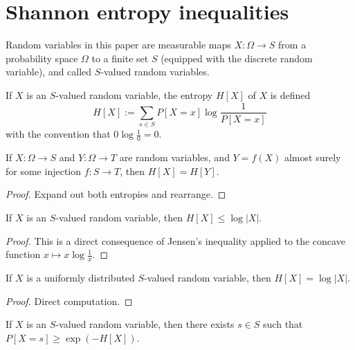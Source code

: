 \chapter{Shannon entropy inequalities}

Random variables in this paper are measurable maps $X : \Omega \to S$ from a probability space $\Omega$ to a finite set $S$ (equipped with the discrete random variable), and called $S$-valued random variables.

\begin{definition}[Entropy]
  \label{entropy-def}
  \leanok
  If $X$ is an $S$-valued random variable, the entropy $H[X]$ of $X$ is defined
  $$ H[X] := \sum_{s \in S} P[X=x] \log \frac{1}{P[X=x]}$$
  with the convention that $0 \log \frac{1}{0} = 0$.
\end{definition}

\begin{lemma}\label{relabeled-entropy}   If $X: \Omega \to S$ and $Y: \Omega \to T$ are random variables, and $Y = f(X)$ almost surely for some injection $f: S \to T$, then $H[X] = H[Y]$.
\end{lemma}

\begin{proof} Expand out both entropies and rearrange.
\end{proof}

\begin{lemma}\label{jensen-bound}
\leanok
If $X$ is an $S$-valued random variable, then $H[X] \leq \log |X|$.
\end{lemma}

\begin{proof}
  This is a direct consequence of Jensen's inequality applied to the concave function $x \mapsto x \log \frac{1}{x}$.
\end{proof}

\begin{lemma}\label{uniform-entropy}
  \leanok
If $X$ is a uniformly distributed $S$-valued random variable, then $H[X] = \log |X|$.
\end{lemma}

\begin{proof} Direct computation.
\end{proof}

\begin{lemma}\label{bound-conc}
  If $X$ is an $S$-valued random variable, then there exists $s \in S$ such that $P[X=s] \geq \exp(-H[X])$.
\end{lemma}

